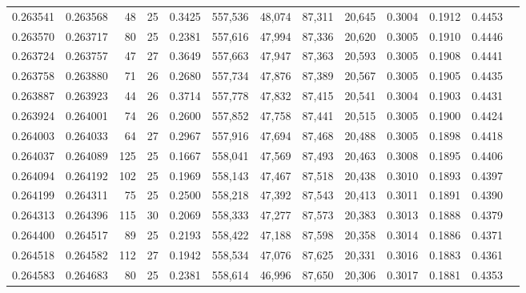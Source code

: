 \begin{tabular}{rrrrrrrrrrrrr}
0.263541 & 0.263568 &  48 &  25 &                                     0.3425 & 557,536 &  48,074 &  87,311 &  20,645 & 0.3004 & 0.1912 & 0.4453 \\
0.263570 & 0.263717 &  80 &  25 &                                     0.2381 & 557,616 &  47,994 &  87,336 &  20,620 & 0.3005 & 0.1910 & 0.4446 \\
0.263724 & 0.263757 &  47 &  27 &                                     0.3649 & 557,663 &  47,947 &  87,363 &  20,593 & 0.3005 & 0.1908 & 0.4441 \\
0.263758 & 0.263880 &  71 &  26 &                                     0.2680 & 557,734 &  47,876 &  87,389 &  20,567 & 0.3005 & 0.1905 & 0.4435 \\
0.263887 & 0.263923 &  44 &  26 &                                     0.3714 & 557,778 &  47,832 &  87,415 &  20,541 & 0.3004 & 0.1903 & 0.4431 \\
0.263924 & 0.264001 &  74 &  26 &                                     0.2600 & 557,852 &  47,758 &  87,441 &  20,515 & 0.3005 & 0.1900 & 0.4424 \\
0.264003 & 0.264033 &  64 &  27 &                                     0.2967 & 557,916 &  47,694 &  87,468 &  20,488 & 0.3005 & 0.1898 & 0.4418 \\
0.264037 & 0.264089 & 125 &  25 &                                     0.1667 & 558,041 &  47,569 &  87,493 &  20,463 & 0.3008 & 0.1895 & 0.4406 \\
0.264094 & 0.264192 & 102 &  25 &                                     0.1969 & 558,143 &  47,467 &  87,518 &  20,438 & 0.3010 & 0.1893 & 0.4397 \\
0.264199 & 0.264311 &  75 &  25 &                                     0.2500 & 558,218 &  47,392 &  87,543 &  20,413 & 0.3011 & 0.1891 & 0.4390 \\
0.264313 & 0.264396 & 115 &  30 &                                     0.2069 & 558,333 &  47,277 &  87,573 &  20,383 & 0.3013 & 0.1888 & 0.4379 \\
0.264400 & 0.264517 &  89 &  25 &                                     0.2193 & 558,422 &  47,188 &  87,598 &  20,358 & 0.3014 & 0.1886 & 0.4371 \\
0.264518 & 0.264582 & 112 &  27 &                                     0.1942 & 558,534 &  47,076 &  87,625 &  20,331 & 0.3016 & 0.1883 & 0.4361 \\
0.264583 & 0.264683 &  80 &  25 &                                     0.2381 & 558,614 &  46,996 &  87,650 &  20,306 & 0.3017 & 0.1881 & 0.4353 \\

\end{tabular}
